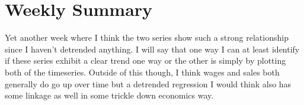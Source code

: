 \section{Weekly Summary}

Yet another week where I think the two series show such a strong relationship since I haven't detrended anything.
I will say that one way I can at least identify if these series exhibit a clear trend one way or the other is 
simply by plotting both of the timeseries. Outside of this though, I think wages and sales both generally do go
up over time but a detrended regression I would think also has some linkage as well in some trickle down economics
way.
